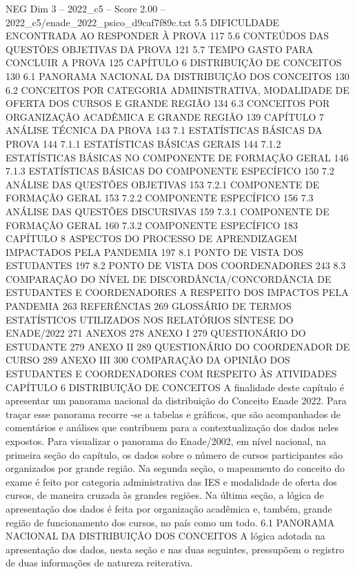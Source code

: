 \begin{textsample}{NEG Dim 3 – 2022\_c5 – Score 2.00 – 2022\_c5/enade\_2022\_psico\_d9caf7f89c.txt}  \label{ex:f3_neg_223}
5.5 DIFICULDADE ENCONTRADA AO RESPONDER À PROVA 117 5.6 CONTEÚDOS DAS QUESTÕES OBJETIVAS DA PROVA 121 5.7 TEMPO GASTO PARA CONCLUIR A PROVA 125 CAPÍTULO 6 DISTRIBUIÇÃO DE CONCEITOS 130 6.1 PANORAMA NACIONAL DA DISTRIBUIÇÃO DOS CONCEITOS 130 6.2 CONCEITOS POR CATEGORIA ADMINISTRATIVA, MODALIDADE DE OFERTA DOS CURSOS E GRANDE REGIÃO 134 6.3 CONCEITOS POR ORGANIZAÇÃO ACADÊMICA E GRANDE REGIÃO 139 CAPÍTULO 7 ANÁLISE TÉCNICA DA PROVA 143 7.1 ESTATÍSTICAS BÁSICAS DA PROVA 144 7.1.1 ESTATÍSTICAS BÁSICAS GERAIS 144 7.1.2 ESTATÍSTICAS BÁSICAS NO COMPONENTE DE FORMAÇÃO GERAL 146 7.1.3 ESTATÍSTICAS BÁSICAS DO COMPONENTE ESPECÍFICO 150 7.2 ANÁLISE DAS QUESTÕES OBJETIVAS 153 7.2.1 COMPONENTE DE FORMAÇÃO GERAL 153 7.2.2 COMPONENTE ESPECÍFICO 156 7.3 ANÁLISE DAS QUESTÕES DISCURSIVAS 159 7.3.1 COMPONENTE DE FORMAÇÃO GERAL 160 7.3.2 COMPONENTE ESPECÍFICO 183 CAPÍTULO 8 ASPECTOS DO PROCESSO DE APRENDIZAGEM IMPACTADOS PELA PANDEMIA 197 8.1 PONTO DE VISTA DOS ESTUDANTES 197 8.2 PONTO DE VISTA DOS COORDENADORES 243 8.3 COMPARAÇÃO DO NÍVEL DE DISCORDÂNCIA/CONCORDÂNCIA DE ESTUDANTES E COORDENADORES A RESPEITO DOS IMPACTOS PELA PANDEMIA 263 REFERÊNCIAS 269 GLOSSÁRIO DE TERMOS ESTATÍSTICOS UTILIZADOS NOS RELATÓRIOS SÍNTESE DO ENADE/2022 271 ANEXOS 278 ANEXO I 279 QUESTIONÁRIO DO ESTUDANTE 279 ANEXO II 289 QUESTIONÁRIO DO COORDENADOR DE CURSO 289 ANEXO III 300 COMPARAÇÃO DA OPINIÃO DOS ESTUDANTES E COORDENADORES COM RESPEITO ÀS ATIVIDADES CAPÍTULO 6 DISTRIBUIÇÃO DE CONCEITOS A finalidade deste capítulo é apresentar um panorama nacional da distribuição do Conceito Enade 2022.
Para traçar esse panorama recorre -se a tabelas e gráficos, que são acompanhados de comentários e análises que contribuem para a contextualização dos dados neles expostos.
Para visualizar o panorama do Enade/2002, em nível nacional, na primeira seção do capítulo, os dados sobre o número de cursos participantes são organizados por grande região.
Na segunda seção, o mapeamento do conceito do exame é feito por categoria administrativa das IES e modalidade de oferta dos cursos, de maneira cruzada às grandes regiões.
Na última seção, a lógica de apresentação dos dados é feita por organização acadêmica e, também, grande região de funcionamento dos cursos, no país como um todo. 6.1 PANORAMA NACIONAL DA DISTRIBUIÇÃO DOS CONCEITOS A lógica adotada na apresentação dos dados, nesta seção e nas duas seguintes, pressupõem o registro de duas informações de natureza reiterativa.

\end{textsample}
